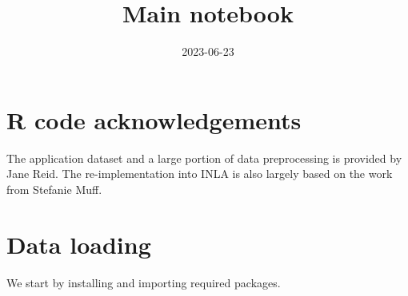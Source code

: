 \documentclass[
]{article}
\title{Main notebook}
\author{}
\date{\vspace{-2.5em}2023-06-23}
\begin{document}
\maketitle

\hypertarget{r-code-acknowledgements}{%
\section*{R code acknowledgements}\label{r-code-acknowledgements}}

The application dataset and a large portion of data preprocessing is
provided by Jane Reid. The re-implementation into INLA is also largely
based on the work from Stefanie Muff.

\hypertarget{data-loading}{%
\section*{Data loading}\label{data-loading}}

We start by installing and importing required packages.
\end{document}
